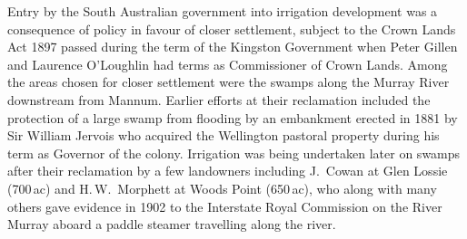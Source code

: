 Entry by the South Australian government into irrigation development
was a consequence of policy in favour of closer settlement, subject to
the Crown Lands Act 1897 passed during the term of the Kingston
Government when Peter Gillen and Laurence O'Loughlin had terms as
Commissioner of Crown Lands.  Among the areas chosen for closer
settlement were the swamps along the Murray River downstream from
Mannum.  Earlier efforts at their reclamation included the protection
of a large swamp from flooding by an embankment erected in 1881 by Sir
William Jervois who acquired the Wellington pastoral property during
his term as Governor of the colony.  Irrigation was being undertaken
later on swamps after their reclamation by a few landowners including
J.~Cowan at Glen Lossie (700\,ac) and H.\,W.~Morphett at Woods Point
(650\,ac), who along with many others gave evidence in 1902 to the
Interstate Royal Commission on the River Murray aboard a paddle
steamer travelling along the river.

